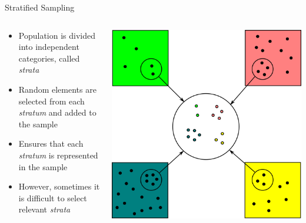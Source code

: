 \begin{frame}{Stratified Sampling}

\begin{columns}
    \begin{column}{0.5\textwidth}
        \begin{itemize}
            \item Population is divided into independent categories, called \textit{strata}
            \item Random elements are selected from each \textit{stratum} and added to the sample
            \item Ensures that each \textit{stratum} is represented in the sample
            \item However, sometimes it is difficult to select relevant \textit{strata}
        \end{itemize}
    \end{column}
    \begin{column}{0.5\textwidth}
        \includegraphics[width=\textwidth]{gfx/stratified_sampling}
    \end{column}
\end{columns}

\end{frame}


